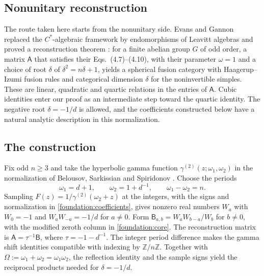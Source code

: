 \documentclass[11pt]{article}
\numberwithin{equation}{section}
\theoremstyle{definition}
\theoremstyle{remark}
\newcommand{\Z}{\mathbb Z}
\begin{document}
\subsection*{Nonunitary reconstruction}

The route taken here starts from the nonunitary side. Evans and Gannon
replaced the $C^*$-algebraic framework by endomorphisms of Leavitt
algebras and proved a reconstruction theorem \cite[Theorem~2(a)]{EG}:
for a finite abelian group $G$ of odd order, a matrix $\mathsf A$
that satisfies their Eqs.~(4.7)--(4.10), with their parameter
$\omega=1$ and a choice of root $\delta$ of
$\delta^2=n\delta+1$, yields a spherical fusion category with
Haagerup--Izumi fusion rules and categorical dimension $\delta$ for the
noninvertible simples. These are linear, quadratic and quartic
relations in the entries of $\mathsf A$. Cubic identities enter our
proof as an intermediate step toward the quartic identity. The
negative root $\delta=-1/d$ is allowed, and the coefficients constructed
below have a natural analytic description in this normalization.

\subsection*{The construction}

Fix odd $n\ge3$ and take the hyperbolic gamma function
$\gamma^{(2)}(z;\omega_1,\omega_2)$ in the normalization of
Belousov, Sarkissian and Spiridonov \cite{BSS}. Choose the periods
\[
 \omega_1=d+1,\qquad \omega_2=1+d^{-1},\qquad \omega_1-\omega_2=n .
\]
Sampling $F(z)=1/\gamma^{(2)}(\omega_2+z)$ at the integers, with the
signs and normalization in \eqref{foundation:coefficients}, gives
nonzero real numbers $W_a$ with $W_0=-1$ and
$W_aW_{-a}=-1/d$ for $a\ne0$. Form
$\mathsf B_{a,b}=W_aW_{b-a}/W_b$ for $b\ne0$, with the modified zeroth
column in \eqref{foundation:core}. The reconstruction matrix is
$\mathsf A=\tau^{-1}\mathsf B$, where $\tau=-1-d^{-1}$.
The integer period difference makes the gamma shift identities
compatible with indexing by $\Z/n\Z$. Together with
$\Omega:=\omega_1+\omega_2=\omega_1\omega_2$, the reflection identity
and the sample signs yield the reciprocal products needed for
$\delta=-1/d$.
\end{document}
